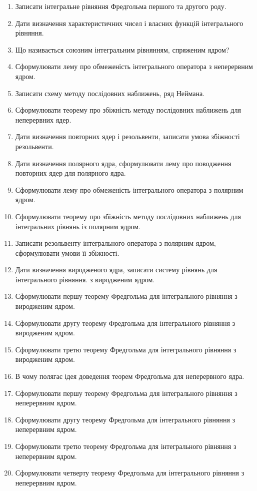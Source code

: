 \begin{enumerate}
	\item Записати інтегральне рівняння Фредгольма першого та другого роду.
	\item Дати визначення характеристичних чисел і власних функцій інтегрального рівняння.
	\item Що називається союзним інтегральним рівнянням, спряженим ядром?
	\item Сформулювати лему про обмеженість інтегрального оператора з неперервним ядром.
	\item Записати схему методу послідовних наближень, ряд Неймана.
	\item Сформулювати теорему про збіжність методу послідовних наближень для неперервних ядер.
	\item Дати визначення повторних ядер і резольвенти, записати умова збіжності резольвенти.
	\item Дати визначення полярного ядра, сформулювати лему про поводження повторних ядер для полярного ядра.
	\item Сформулювати лему про обмеженість інтегрального оператора з полярним ядром.
	\item Сформулювати теорему про збіжність методу послідовних наближень для інтегральних рівнянь із полярним ядром.
	\item Записати резольвенту інтегрального оператора з полярним ядром, сформулювати умови її збіжності.
	\item Дати визначення виродженого ядра, записати систему рівнянь для інтегрального рівняння. з виродженим ядром.
	\item Сформулювати першу теорему Фредгольма для інтегрального рівняння з виродженим ядром.
	\item Сформулювати другу теорему Фредгольма для інтегрального рівняння з виродженим ядром.
	\item Сформулювати третю теорему Фредгольма для інтегрального рівняння з виродженим ядром.
	\item В чому полягає ідея доведення теорем Фредгольма для неперервного ядра.
	\item Сформулювати першу теорему Фредгольма для інтегрального рівняння з неперервним ядром.
	\item Сформулювати другу теорему Фредгольма для інтегрального рівняння з неперервним ядром.
	\item Сформулювати третю теорему Фредгольма для інтегрального рівняння з неперервним ядром.
	\item Сформулювати четверту теорему Фредгольма для інтегрального рівняння з неперервним ядром.

\end{enumerate}
